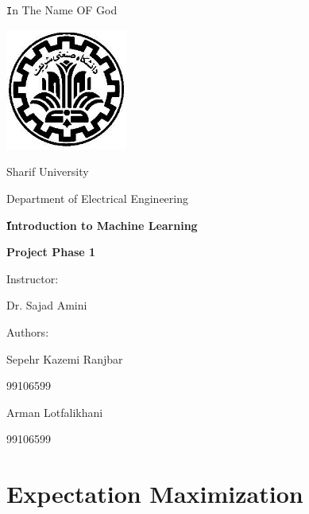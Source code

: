 \documentclass[11pt,a4paper]{article}
\begin{document}
	\begin{titlepage}	
		\centering
		\centering
	{\texttt In The Name OF God}
	
	\vspace{0.50cm}
	\includegraphics[height=4cm , width=4cm]{sharif_logo.png}
	
	\vspace{0.35cm}
	\Large
	Sharif University
	
	\vspace{0.30cm}
	\large
	Department of Electrical Engineering
	
	\vspace{1cm}
	\huge
	\textbf{ََََIntroduction to Machine Learning}
	
	\vspace{0.4cm}
	\textbf{Project Phase 1}
	
	\vspace{2cm}
	\Large
	Instructor:
	\vspace{0.2cm}
	
	Dr. Sajad Amini
	
	\vspace{3cm}
	Authors:
	\vspace{0.2cm}
	
	Sepehr Kazemi Ranjbar
	
	\vspace{0.2cm} 
	99106599
	
	\vspace{0.4cm}
	Arman Lotfalikhani
	
	\vspace{0.2cm} 
	99106599
		
	\end{titlepage}
	\restoregeometry
	\setcounter{section}{1}
	\section{Expectation Maximization}
	\setcounter{subsection}{2}
	\setcounter{subsubsection}{2}
\end{document}
